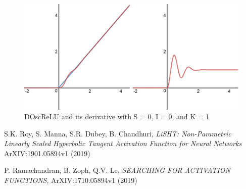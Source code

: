 \documentclass{amsart}
\theoremstyle{definition}
\theoremstyle{remark}
\numberwithin{equation}{section}
\newcommand{\blankbox}[2]{%
  \parbox{\columnwidth}{\centering
    \setlength{\fboxsep}{0pt}%
    \fbox{\raisebox{0pt}[#2]{\hspace{#1}}}%
  }%
}
\begin{document}
\begin{figure}[!h]
\includegraphics[1]{DOscReLU_with_ReLU_Deriv.png}
\caption{DOscReLU and its derivative with S = 0, I = 0, and K = 1}
\label{Figure 3}
\end{figure}  



\begin{thebibliography}{10}

 S.K. Roy, S. Manna, S.R. Dubey, B. Chaudhuri, \textit{LiSHT: Non-Parametric Linearly Scaled Hyperbolic Tangent Activation Function for Neural Networks} ArXIV:1901.05894v1 (2019)

 P. Ramachandran, B. Zoph, Q.V. Le, \textit{SEARCHING FOR ACTIVATION FUNCTIONS}, ArXIV:1710.05894v1 (2019)

\end{thebibliography}
\end{document}
